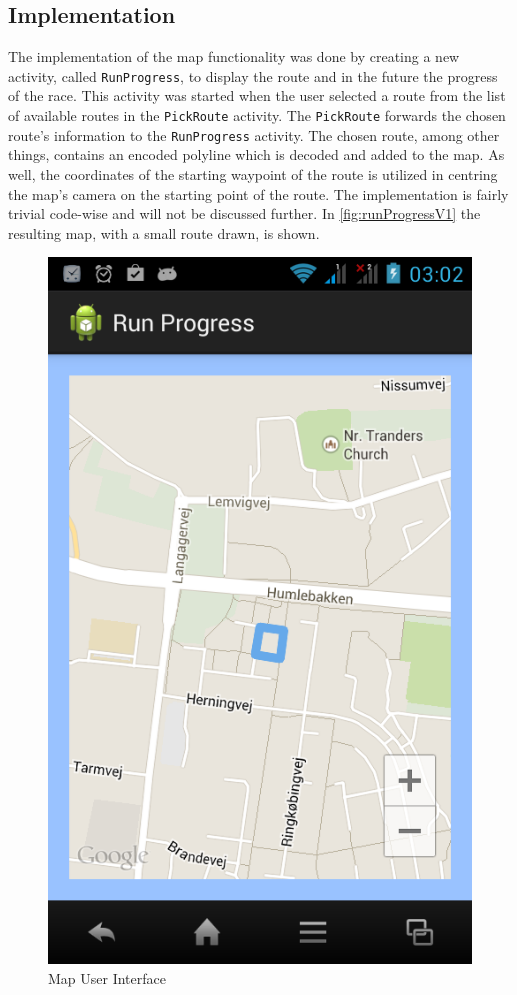 \subsection{Implementation}
The implementation of the map functionality was done by creating a new activity, called \texttt{RunProgress}, to display the route and in the future the progress of the race. This activity was started when the user selected a route from the list of available routes in the \texttt{PickRoute} activity. The \texttt{PickRoute} forwards the chosen route's information to the \texttt{RunProgress} activity. The chosen route, among other things, contains an encoded polyline which is decoded and added to the map. As well, the coordinates of the starting waypoint of the route is utilized in centring the map's camera on the starting point of the route. The implementation is fairly trivial code-wise and will not be discussed further. In \autoref{fig:runProgressV1} the resulting map, with a small route drawn, is shown.

\begin{figure}[!ht]
	\begin{center}
		\includegraphics[scale=0.4]{img/runProgressV1.png}
		\caption{Map User Interface}
		\label{fig:runProgressV1}
	\end{center}
\end{figure}

